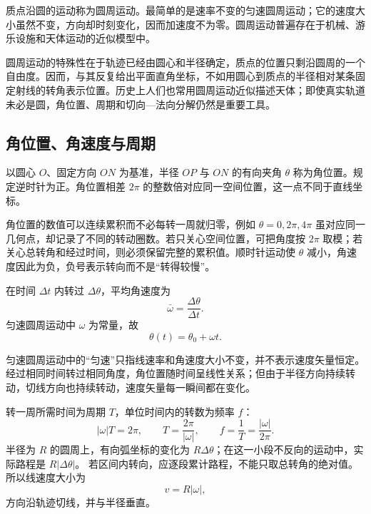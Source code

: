 
质点沿圆的运动称为圆周运动。最简单的是速率不变的匀速圆周运动；它的速度大小虽然不变，方向却时刻变化，因而加速度不为零。圆周运动普遍存在于机械、游乐设施和天体运动的近似模型中。

圆周运动的特殊性在于轨迹已经由圆心和半径确定，质点的位置只剩沿圆周的一个自由度。因而，与其反复给出平面直角坐标，不如用圆心到质点的半径相对某条固定射线的转角表示位置。历史上人们也常用圆周运动近似描述天体；即使真实轨道未必是圆，角位置、周期和切向—法向分解仍然是重要工具。

\subsection{角位置、角速度与周期}

\CirclePositionDiagram

以圆心 $O$、固定方向 $ON$ 为基准，半径 $OP$ 与 $ON$ 的有向夹角 $\theta$ 称为角位置。规定逆时针为正。角位置相差 $2\pi$ 的整数倍对应同一空间位置，这一点不同于直线坐标。

角位置的数值可以连续累积而不必每转一周就归零，例如 $\theta=0,2\pi,4\pi$ 虽对应同一几何点，却记录了不同的转动圈数。若只关心空间位置，可把角度按 $2\pi$ 取模；若关心总转角和经过时间，则必须保留完整的累积值。顺时针运动使 $\theta$ 减小，角速度因此为负，负号表示转向而不是“转得较慢”。

在时间 $\Delta t$ 内转过 $\Delta\theta$，平均角速度为
\begin{equation}
 \bar\omega=\frac{\Delta\theta}{\Delta t}.
\end{equation}
匀速圆周运动中 $\omega$ 为常量，故
\begin{equation}
 \theta(t)=\theta_0+\omega t.
\end{equation}

\AngularSignDiagram

匀速圆周运动中的“匀速”只指线速率和角速度大小不变，并不表示速度矢量恒定。经过相同时间转过相同角度，角位置随时间呈线性关系；但由于半径方向持续转动，切线方向也持续转动，速度矢量每一瞬间都在变化。

转一周所需时间为周期 $T$，单位时间内的转数为频率 $f$：
\begin{equation}
 |\omega|T=2\pi,\qquad T=\frac{2\pi}{|\omega|},\qquad
 f=\frac1T=\frac{|\omega|}{2\pi}.
\end{equation}
半径为 $R$ 的圆周上，有向弧坐标的变化为 $R\Delta\theta$；在这一小段不反向的运动中，实际路程是 $R|\Delta\theta|$。
若区间内转向，应逐段累计路程，不能只取总转角的绝对值。所以线速度大小为
\begin{equation}
 v=R|\omega|,
\end{equation}
方向沿轨迹切线，并与半径垂直。

